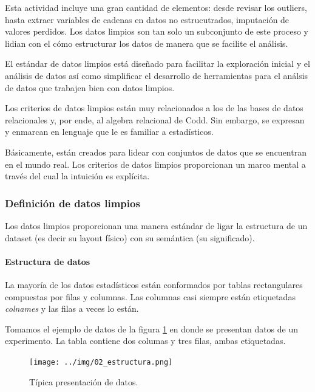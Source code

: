 \documentclass[]{article}
\begin{document}
Esta actividad incluye una gran cantidad de elementos: desde revisar los
outliers, hasta extraer variables de cadenas en datos no estrucutrados,
imputación de valores perdidos. Los datos limpios son tan solo un
subconjunto de este proceso y lidian con el cómo estructurar los datos
de manera que se facilite el análisis.

El estándar de datos limpios está diseñado para facilitar la exploración
inicial y el análisis de datos así como simplificar el desarrollo de
herramientas para el análsis de datos que trabajen bien con datos
limpios.

Los criterios de datos limpios están muy relacionados a los de las bases
de datos relacionales y, por ende, al algebra relacional de Codd. Sin
embargo, se expresan y enmarcan en lenguaje que le es familiar a
estadísticos.

Básicamente, están creados para lidear con conjuntos de datos que se
encuentran en el mundo real. Los criterios de datos limpios proporcionan
un marco mental a través del cual la intuición es explícita.

\subsubsection{Definición de datos
limpios}\label{definicion-de-datos-limpios}

Los datos limpios proporcionan una manera estándar de ligar la
estructura de un dataset (es decir su layout físico) con su semántica
(su significado).

\paragraph{Estructura de datos}\label{estructura-de-datos}

La mayoría de los datos estadísticos están conformados por tablas
rectangulares compuestas por filas y columnas. Las columnas casi siempre
están etiquetadas \emph{colnames} y las filas a veces lo están.

Tomamos el ejemplo de datos de la figura \ref{fig:estructura} en donde
se presentan datos de un experimento. La tabla contiene dos columas y
tres filas, ambas etiquetadas.

\begin{figure}[h]
    \centering
    \texttt{[image: ../img/02\_estructura.png]}
    \caption{Típica presentación de datos.}
    \label{fig:estructura}
\end{figure}
\end{document}
